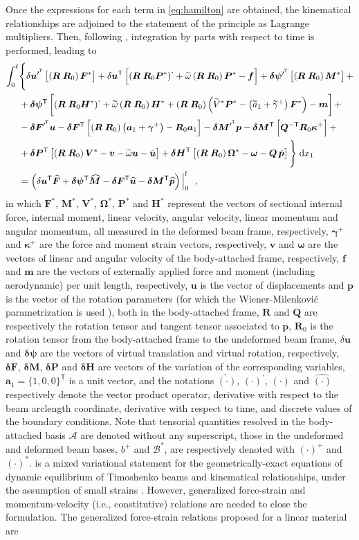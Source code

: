 \documentclass[journal]{new-aiaa}
\newcommand{\vect}[1]{\bm{#1}}
\newcommand{\uvec}[1]{\bm{#1}}
\def\tens#1{\bm{#1}}
\def\til#1{\widetilde{#1}}
\def\lb{\left[}
\def\rb{\right]}
\def\lp{\left(}
\def\rp{\right)}
\def\T{\mathsf{T}}
\def\A{\mathcal{A}}
\def\bp{b^+}
\def\B*{\mathcal{B}^*}
\def\xo{x_1}
\def\aone{\uvec{a}_1}
\def\aonetil{\til{a}_1}
\def\dotout{^{\boldsymbol{\cdot}}}
\def\R{\tens{R}}
\def\Rz{\R_0}
\def\u{\vect{u}}
\def\uT{\u^\T}
\def\udot{\dot{\u}}
\def\uprimeT{\u^{\prime^\T}}
\def\uhat{\widehat{\u}}
\def\vb{\vect{v}}
\def\om{\vect{\omega}}
\def\omtil{\til{\omega}}
\def\gam{\vect{\gamma}}
\def\gamp{\gam^{+}}
\def\gamptil{\til{\gamma}^{+}}
\def\kap{\vect{\kappa}}
\def\kapp{\kap^{+}}
\def\V{\vect{V}}
\def\Vs{\V^{*}}
\def\Vtils{\til{V}^{*}}
\def\Om{\vect{\Omega}}
\def\Oms{\Om^{*}}
\def\P{\vect{P}}
\def\Ps{\P^*}
\def\Hv{\vect{H}}
\def\Hvs{\Hv^*}
\def\Q{\tens{Q}}
\def\HinvT{\Q^{-\T}}
\def\p{\vect{p}}
\def\pdot{\dot{\p}}
\def\phat{\widehat{\p}}
\def\F{\vect{F}}
\def\Fhat{\widehat{\F}}
\def\Fs{\F^*}
\def\M{\vect{M}}
\def\Mhat{\widehat{\M}}
\def\Ms{\M^*}
\def\f{\vect{f}}
\def\m{\vect{m}}
\def\delF{\vect{\delta F}}
\def\delFT{\delF^\T}
\def\delFpT{\delF^{\prime^\T}}
\def\delM{\vect{\delta M}}
\def\delMT{\delM^\T}
\def\delMpT{\delM^{\prime^\T}}
\def\delP{\vect{\delta P}}
\def\delPT{\delP^\T}
\def\delH{\vect{\delta H}}
\def\delHT{\delH^\T}
\def\delpsi{\vect{\delta\psi}}
\def\delpsiT{\delpsi^\T}
\def\delpsipT{\delpsi^{\prime^\T}}
\def\intl{\int_{0}^{\ell}}
\def\d{\textnormal{d}}
\def\RRz{\lp\R\;\Rz\rp}
\begin{document}
Once the expressions for each term in \cref{eq:hamilton} are obtained, the kinematical relationships are adjoined to the statement of the principle as Lagrange multipliers. Then, following \cite{hodges2006nonlinear}, integration by parts with respect to time is performed, leading to
\begin{align}
    \intl &\Biggl\{\Biggr. \delta\uprimeT\lb\RRz\Fs\rb + \delta\uT\lb\lp\R\;\Rz\Ps\rp\dotout+\omtil\RRz\Ps-\f\rb + \delpsipT\lb\RRz\Ms\rb +
    \nonumber \\	&+\delpsiT\lb\lp\R\;\Rz\Hvs\rp\dotout+\omtil\RRz\Hvs+\RRz\lp\Vtils\Ps-\lp\aonetil+\gamptil\rp\Fs\rp-\m\rb + \nonumber \\
    &-\delFpT\u -\delFT\lb\RRz\lp\aone+\gamp\rp-\Rz\aone\rb - \delMpT\p -\delMT\lb\HinvT\Rz\kapp\rb +
    \nonumber \\
    &+\delPT\lb\RRz\Vs-\vb-\omtil\u-\udot\rb + \delHT\lb\RRz\Oms-\om-\Q\,\pdot\rb
    \Biggl.\Biggr\}\;\d \xo \nonumber \\
    &=\lp \delta\uT\Fhat+\delpsiT\Mhat-\delFT\uhat-\delMT\phat \rp\Big|_{0}^{l} \ \ ,
    \label{eq:hamilton_lagrange}
\end{align}
in which $\Fs$, $\Ms$, $\Vs$, $\Oms$, $\Ps$ and $\Hvs$ 
represent the vectors of sectional internal force, internal moment, linear velocity, angular velocity, linear momentum and angular momentum, all measured in the deformed beam frame, respectively, $\gamp$ and $\kapp$ are the force and moment strain vectors, respectively, $\vb$ and $\om$ are the vectors of linear and angular velocity of the body-attached frame, respectively, $\f$ and $\m$ are the vectors of externally applied force and moment (including aerodynamic) per unit length, respectively, $\vect{u}$ is the vector of displacements and $\p$ is the vector of the rotation parameters (for which the Wiener-Milenkovi{\'c} parametrization is used \cite{wang2017geometrically}), both in the body-attached frame, $\R$ and $\Q$ are respectively the rotation tensor and tangent tensor associated to $\p$, $\Rz$ is the rotation tensor from the body-attached frame to the undeformed beam frame, $\delta\u$ and $\delpsi$ are the vectors of virtual translation and virtual rotation, respectively, $\delF$, $\delM$, $\delP$ and $\delH$ are vectors of the variation of the corresponding variables, $\aone=\{1,0,0\}^\T$ is a unit vector, and the notations $\tilde{\lp\cdot\rp}$, $\lp\cdot\rp^\prime$, $\dot{\lp\cdot\rp}$ and $\hat{\lp\cdot\rp}$ respectively denote the vector product operator, derivative with respect to the beam arclength coordinate, derivative with respect to time, and discrete values of the boundary conditions. Note that tensorial quantities resolved in the body-attached basis $\A$ are denoted without any superscript, those in the undeformed and deformed beam bases, $\bp$ and $\B*$, are respectively denoted with $(\cdot)^+$ and $(\cdot)^*$.  is a mixed variational statement for the geometrically-exact equations of dynamic equilibrium of Timoshenko beams and kinematical relationships, under the assumption of small strains \cite{hodges2006nonlinear}. However, generalized force-strain and momentum-velocity (i.e., constitutive) relations are needed to close the formulation. The generalized force-strain relations proposed for a linear material are
\end{document}
